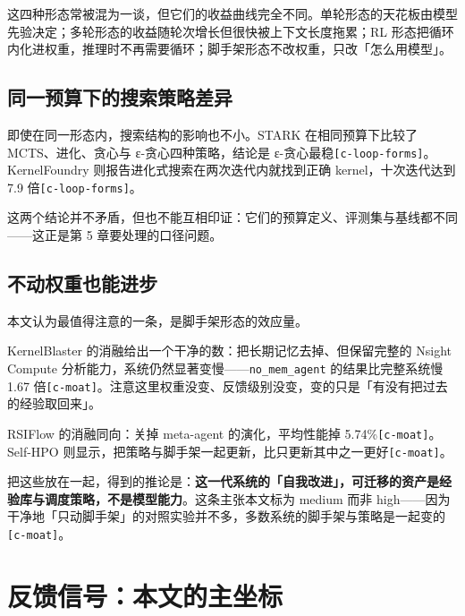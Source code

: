 这四种形态常被混为一谈，但它们的收益曲线完全不同。单轮形态的天花板由模型先验决定；多轮形态的收益随轮次增长但很快被上下文长度拖累；RL 形态把循环内化进权重，推理时不再需要循环；脚手架形态不改权重，只改「怎么用模型」。


\subsection{同一预算下的搜索策略差异}

即使在同一形态内，搜索结构的影响也不小。STARK 在相同预算下比较了 MCTS、进化、贪心与 ε-贪心四种策略，结论是 ε-贪心最稳{\scriptsize\texttt{[c-\hspace{0pt}loop-\hspace{0pt}forms]}}。KernelFoundry 则报告进化式搜索在两次迭代内就找到正确 kernel，十次迭代达到 7.9 倍{\scriptsize\texttt{[c-\hspace{0pt}loop-\hspace{0pt}forms]}}。


这两个结论并不矛盾，但也不能互相印证：它们的预算定义、评测集与基线都不同——这正是第 5 章要处理的口径问题。


\subsection{不动权重也能进步}

本文认为最值得注意的一条，是脚手架形态的效应量。


KernelBlaster 的消融给出一个干净的数：把长期记忆去掉、但保留完整的 Nsight Compute 分析能力，系统仍然显著变慢——\texttt{no\_mem\_agent} 的结果比完整系统慢 1.67 倍{\scriptsize\texttt{[c-\hspace{0pt}moat]}}。注意这里权重没变、反馈级别没变，变的只是「有没有把过去的经验取回来」。


RSIFlow 的消融同向：关掉 meta-agent 的演化，平均性能掉 5.74\%{\scriptsize\texttt{[c-\hspace{0pt}moat]}}。Self-HPO 则显示，把策略与脚手架一起更新，比只更新其中之一更好{\scriptsize\texttt{[c-\hspace{0pt}moat]}}。


把这些放在一起，得到的推论是：\textbf{这一代系统的「自我改进」，可迁移的资产是经验库与调度策略，不是模型能力}。这条主张本文标为 medium 而非 high——因为干净地「只动脚手架」的对照实验并不多，多数系统的脚手架与策略是一起变的{\scriptsize\texttt{[c-\hspace{0pt}moat]}}。


\section{反馈信号：本文的主坐标}

